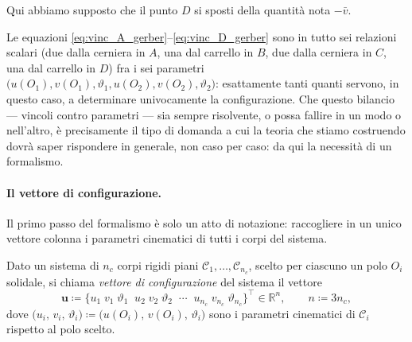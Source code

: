 Qui abbiamo supposto che il punto $D$ si sposti della quantità nota $-\bar{v}$.

Le equazioni \eqref{eq:vinc_A_gerber}--\eqref{eq:vinc_D_gerber} sono in
tutto sei relazioni scalari (due dalla cerniera in $A$, una dal carrello
in $B$, due dalla cerniera in $C$, una dal carrello in $D$) fra i sei
parametri $\bigl(u(O_1),v(O_1),\vartheta_1,u(O_2),v(O_2),\vartheta_2
\bigr)$: esattamente tanti quanti servono, in questo caso, a determinare
univocamente la configurazione. Che questo bilancio --- vincoli contro
parametri --- sia sempre risolvente, o possa fallire in un modo o
nell'altro, è precisamente il tipo di domanda a cui la teoria che stiamo
costruendo dovrà saper rispondere in generale, non caso per caso: da qui
la necessità di un formalismo.

\paragraph{Il vettore di configurazione.}
Il primo passo del formalismo è solo un atto di notazione: raccogliere in un unico vettore
colonna i parametri cinematici di tutti i corpi del sistema.


	Dato un sistema di $n_c$ corpi rigidi piani $\mathcal{C}_1,\dots,
	\mathcal{C}_{n_c}$, scelto per ciascuno un polo $O_i$ solidale, si
	chiama \emph{vettore di configurazione}
	del sistema il vettore
	\begin{equation}\label{eq:vettore_u_SCR}
		\bm{u} \coloneqq
		\bigl\{
		u_1\; v_1\; \vartheta_1 \;\;
		u_2\; v_2\; \vartheta_2 \;\;
		\cdots \;\;
		u_{n_c}\; v_{n_c}\; \vartheta_{n_c}
		\bigr\}^{\!\top}
		\in \mathbb{R}^{n}, \qquad n\coloneqq 3n_c,
	\end{equation}
	dove $\bigl(u_i,\,v_i,\,\vartheta_i\bigr)\coloneqq\bigl(u(O_i),\,
	v(O_i),\,\vartheta_i\bigr)$ sono i parametri cinematici di
	$\mathcal{C}_i$ rispetto al polo scelto.



